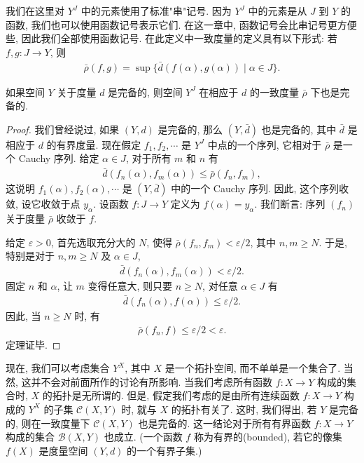 \documentclass[../../main.tex]{subfiles}
\begin{document}
我们在这里对 $Y^J$ 中的元素使用了标准"串"记号. 因为 $Y^J$ 中的元素是从 $J$ 到 $Y$ 的函数, 我们也可以使用函数记号表示它们. 在这一章中, 函数记号会比串记号更方便些, 因此我们全部使用函数记号. 在此定义中一致度量的定义具有以下形式: 若 $f,g\colon J\to Y$, 则
\begin{align*}
\bar{\rho}(f,g)=\sup\{\bar{d}(f(\alpha),g(\alpha))\mid\alpha\in J\}.
\end{align*}

\begin{theorem}\label{theorem:ch07-uniform-power-complete}
如果空间 $Y$ 关于度量 $d$ 是完备的, 则空间 $Y^J$ 在相应于 $d$ 的一致度量 $\bar{\rho}$ 下也是完备的.
\end{theorem}

\begin{proof}
我们曾经说过, 如果 $(Y,d)$ 是完备的, 那么 $(Y,\bar{d})$ 也是完备的, 其中 $\bar{d}$ 是相应于 $d$ 的有界度量. 现在假定 $f_1,f_2,\cdots$ 是 $Y^J$ 中点的一个序列, 它相对于 $\bar{\rho}$ 是一个 Cauchy 序列. 给定 $\alpha\in J$, 对于所有 $m$ 和 $n$ 有
\begin{align*}
\bar{d}(f_n(\alpha),f_m(\alpha))\leqslant\bar{\rho}(f_n,f_m),
\end{align*}
这说明 $f_1(\alpha),f_2(\alpha),\cdots$ 是 $(Y,\bar{d})$ 中的一个 Cauchy 序列. 因此, 这个序列收敛, 设它收敛于点 $y_\alpha$. 设函数 $f\colon J\to Y$ 定义为 $f(\alpha)=y_\alpha$. 我们断言: 序列 $(f_n)$ 关于度量 $\bar{\rho}$ 收敛于 $f$.

给定 $\varepsilon>0$, 首先选取充分大的 $N$, 使得 $\bar{\rho}(f_n,f_m)<\varepsilon/2$, 其中 $n,m\geqslant N$. 于是, 特别是对于 $n,m\geqslant N$ 及 $\alpha\in J$,
\begin{align*}
\bar{d}(f_n(\alpha),f_m(\alpha))<\varepsilon/2.
\end{align*}
固定 $n$ 和 $\alpha$, 让 $m$ 变得任意大, 则只要 $n\geqslant N$, 对任意 $\alpha\in J$ 有
\begin{align*}
\bar{d}(f_n(\alpha),f(\alpha))\leqslant\varepsilon/2.
\end{align*}
因此, 当 $n\geqslant N$ 时, 有
\begin{align*}
\bar{\rho}(f_n,f)\leqslant\varepsilon/2<\varepsilon.
\end{align*}
定理证毕.
\end{proof}

现在, 我们可以考虑集合 $Y^X$, 其中 $X$ 是一个拓扑空间, 而不单单是一个集合了. 当然, 这并不会对前面所作的讨论有所影响. 当我们考虑所有函数 $f\colon X\to Y$ 构成的集合时, $X$ 的拓扑是无所谓的. 但是, 假定我们考虑的是由所有连续函数 $f\colon X\to Y$ 构成的 $Y^X$ 的子集 $\mathcal{C}(X,Y)$ 时, 就与 $X$ 的拓扑有关了. 这时, 我们得出, 若 $Y$ 是完备的, 则在一致度量下 $\mathcal{C}(X,Y)$ 也是完备的. 这一结论对于所有有界函数 $f\colon X\to Y$ 构成的集合 $\mathcal{B}(X,Y)$ 也成立. (一个函数 $f$ 称为有界的(bounded), 若它的像集 $f(X)$ 是度量空间 $(Y,d)$ 的一个有界子集.)
\end{document}
